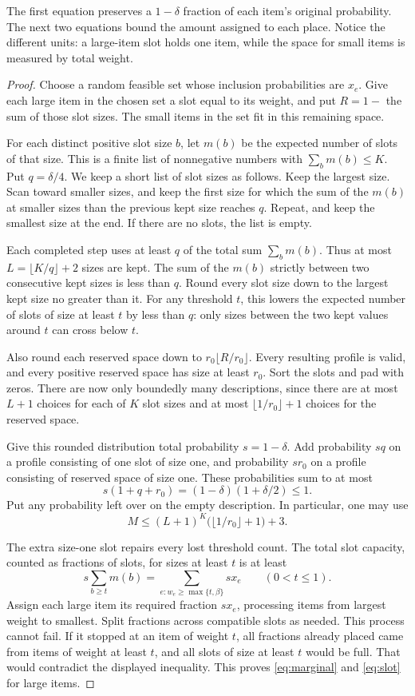 \documentclass[11pt]{article}
\theoremstyle{definition}\newtheorem{algorithm}{Algorithm}[section]
\numberwithin{equation}{section}
\theoremstyle{remark}\newtheorem*{remark}{Remark}
\begin{document}
The first equation preserves a $1-\delta$ fraction of each item's
original probability. The next two equations bound the amount assigned
to each place. Notice the different units: a large-item slot holds one
item, while the space for small items is measured by total weight.

\begin{proof}
Choose a random feasible set whose inclusion probabilities are $x_e$.
Give each large item in the chosen set a slot equal to its weight, and
put $R=1-$ the sum of those slot sizes. The small items in the set fit
in this remaining space.

For each distinct positive slot size $b$, let $m(b)$ be the expected
number of slots of that size. This is a finite list of nonnegative
numbers with $\sum_bm(b)\le K$. Put $q=\delta/4$. We keep a short
list of slot sizes as follows. Keep the largest size. Scan toward
smaller sizes, and keep the first size for which the sum of the $m(b)$
at smaller sizes than the previous kept size reaches $q$. Repeat, and keep the
smallest size at the end. If there are no slots, the list is empty.

Each completed step uses at least $q$ of the total sum $\sum_bm(b)$.
Thus at most $L=\lfloor K/q\rfloor+2$ sizes are kept. The sum of the
$m(b)$ strictly between two consecutive kept sizes is less than $q$.
Round every slot size down to the largest kept size no greater than it.
For any threshold $t$, this lowers the expected number of slots of size
at least $t$ by less than $q$: only sizes between the two kept values
around $t$ can cross below $t$.

Also round each reserved space down to $r_0\lfloor R/r_0\rfloor$.
Every resulting profile is valid, and every positive reserved
space has size at least $r_0$. Sort the slots and pad with zeros.
There are now only boundedly many descriptions, since there are at most
$L+1$ choices for each of $K$ slot sizes and at most
$\lfloor1/r_0\rfloor+1$ choices for the reserved space.

Give this rounded distribution total probability $s=1-\delta$.
Add probability $sq$ on a profile consisting of one slot of size
one, and probability $sr_0$ on a profile consisting of reserved
space of size one. These probabilities sum to at most
\[
 s(1+q+r_0)=(1-\delta)(1+\delta/2)\le1.
\]
Put any probability left over on the empty description. In particular,
one may use
\[
 M\le(L+1)^K\bigl(\lfloor1/r_0\rfloor+1\bigr)+3.
\]

The extra size-one slot repairs every lost threshold count. The total
slot capacity, counted as fractions of slots, for sizes at least $t$
is at least
\[
 s\sum_{b\ge t}m(b)
 =\sum_{e:w_e\ge\max\{t,\beta\}}sx_e
 \qquad(0<t\le1).
\]
Assign each large item its required fraction $sx_e$, processing items
from largest weight to smallest. Split fractions across compatible
slots as needed. This process cannot fail. If it stopped at an item
of weight $t$, all fractions already placed came from items of weight
at least $t$, and all slots of size at least $t$ would be full. That
would contradict the displayed inequality. This proves
\eqref{eq:marginal} and \eqref{eq:slot} for large items.


\end{proof}
\end{document}
